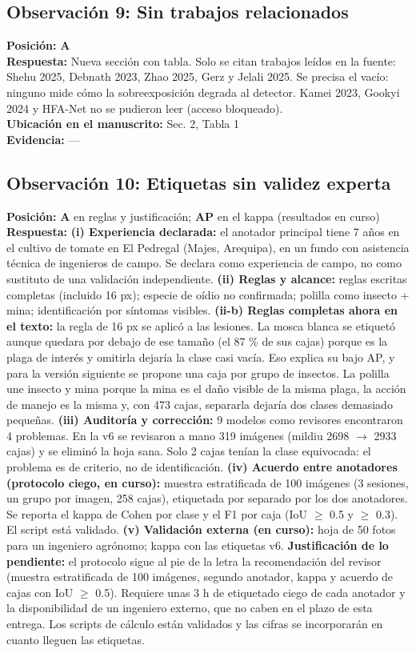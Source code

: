 \documentclass[11pt,a4paper]{article}
\begin{document}
\subsection*{Observación 9: Sin trabajos relacionados}
\noindent\textbf{Posición:} \textbf{A}\\
\textbf{Respuesta:} Nueva sección con tabla. Solo se citan trabajos leídos en la fuente: Shehu 2025, Debnath 2023, Zhao 2025, Gerz y Jelali 2025. Se precisa el vacío: ninguno mide cómo la sobreexposición degrada al detector. Kamei 2023, Gookyi 2024 y HFA-Net no se pudieron leer (acceso bloqueado).\\
\textbf{Ubicación en el manuscrito:} Sec. 2, Tabla 1\\
\textbf{Evidencia:} —

\subsection*{Observación 10: Etiquetas sin validez experta}
\noindent\textbf{Posición:} \textbf{A} en reglas y justificación; \textbf{AP} en el kappa (resultados en curso)\\
\textbf{Respuesta:} \textbf{(i) Experiencia declarada:} el anotador principal tiene 7 años en el cultivo de tomate en El Pedregal (Majes, Arequipa), en un fundo con asistencia técnica de ingenieros de campo. Se declara como experiencia de campo, no como sustituto de una validación independiente. \textbf{(ii) Reglas y alcance:} reglas escritas completas (incluido 16 px); especie de oídio no confirmada; polilla como insecto + mina; identificación por síntomas visibles. \textbf{(ii-b) Reglas completas ahora en el texto:} la regla de 16 px se aplicó a las lesiones. La mosca blanca se etiquetó aunque quedara por debajo de ese tamaño (el 87 \% de sus cajas) porque es la plaga de interés y omitirla dejaría la clase casi vacía. Eso explica su bajo AP, y para la versión siguiente se propone una caja por grupo de insectos. La polilla une insecto y mina porque la mina es el daño visible de la misma plaga, la acción de manejo es la misma y, con 473 cajas, separarla dejaría dos clases demasiado pequeñas. \textbf{(iii) Auditoría y corrección:} 9 modelos como revisores encontraron 4 problemas. En la v6 se revisaron a mano 319 imágenes (mildiu 2698 $\rightarrow$ 2933 cajas) y se eliminó la hoja sana. Solo 2 cajas tenían la clase equivocada: el problema es de criterio, no de identificación. \textbf{(iv) Acuerdo entre anotadores (protocolo ciego, en curso):} muestra estratificada de 100 imágenes (3 sesiones, un grupo por imagen, 258 cajas), etiquetada por separado por los dos anotadores. Se reporta el kappa de Cohen por clase y el F1 por caja (IoU $\geq$ 0.5 y $\geq$ 0.3). El script está validado. \textbf{(v) Validación externa (en curso):} hoja de 50 fotos para un ingeniero agrónomo; kappa con las etiquetas v6. \textbf{Justificación de lo pendiente:} el protocolo sigue al pie de la letra la recomendación del revisor (muestra estratificada de 100 imágenes, segundo anotador, kappa y acuerdo de cajas con IoU $\geq$ 0.5). Requiere unas 3 h de etiquetado ciego de cada anotador y la disponibilidad de un ingeniero externo, que no caben en el plazo de esta entrega. Los scripts de cálculo están validados y las cifras se incorporarán en cuanto lleguen las etiquetas.\\
\end{document}
